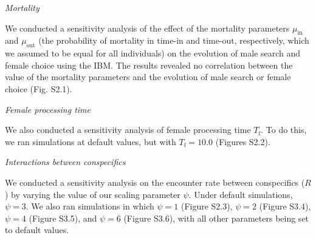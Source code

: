 \documentclass[
]{article}
\begin{document}
\emph{Mortality}

We conducted a sensitivity analysis of the effect of the mortality
parameters \(\mu_{\mathrm{in}}\) and \(\mu_{\mathrm{out}}\) (the
probability of mortality in time-in and time-out, respectively, which we
assumed to be equal for all individuals) on the evolution of male search
and female choice using the IBM. The results revealed no correlation
between the value of the mortality parameters and the evolution of male
search or female choice (Fig. S2.1).

\emph{Female processing time}

We also conducted a sensitivity analysis of female processing time
\(T_{\mathrm{f}}\). To do this, we ran simulations at default values,
but with \(T_{\mathrm{f}} = 10.0\) (Figures S2.2).

\emph{Interactions between conspecifics}

We conducted a sensitivity analysis on the encounter rate between
conspecifics (\(R\)) by varying the value of our scaling parameter
\(\psi\). Under default simulations, \(\psi = 3\). We also ran
simulations in which \(\psi = 1\) (Figure S2.3), \(\psi = 2\) (Figure
S3.4), \(\psi = 4\) (Figure S3.5), and \(\psi = 6\) (Figure S3.6), with
all other parameters being set to default values.

\clearpage

\captionsetup{labelformat=empty}
\end{document}

